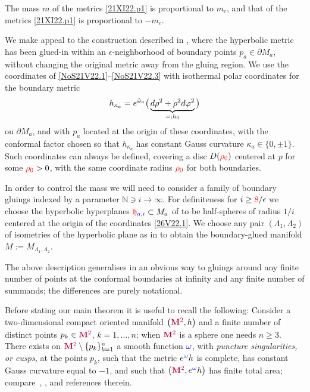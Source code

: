 \documentclass[10pt,a4paper]{article}
\numberwithin{equation}{section}
\newcommand{\blue}[1]{{\color{blue}#1}}
\newcommand{\horo}{\red{\mathfrak{h}}}
\newcommand{\N}{\mathbb N}
\newcommand{\ominf}{\blue{\omega}}
\newcommand{\purple}[1]{{\color{purple}#1}}
\newcommand{\red}[1]{{\color{red}#1}}
\newcommand{\rhozero}{\red{\rho_0}}
\newcommand{\twodimN}{\purple{\mathbf{M}^2}}
\newcommand{\zomega}{\mathring{\omega}}%
\begin{document}
 The mass $m$ of the metrics \eqref{21XI22.p1} is proportional to $m_c$, and that of the metrics \eqref{21XI22.p1} is proportional to $-m_c$.

We make appeal to the construction described in \cite[Section~2]{CDW}, where the hyperbolic metric has been glued-in within an $\epsilon$-neighborhood of boundary points $p_a\in \partial M_a$, {without changing the original metric away from the gluing region}.
We use the coordinates of \eqref{NoS21V22.1}--\eqref{NoS21V22.3}
with isothermal
polar coordinates for the boundary metric
\begin{equation}\label{26V22.1}
 h_{\kappa_a} ={\rm e}^{\zomega_a}
 \big(\underbrace{{\rm d}\rho^2 + \rho^2 {\rm d}\varphi^2}_{=:h_0} \big)
\end{equation}
on $\partial M_a$, and with $p_a$ located at the origin of these coordinates, with the conformal factor chosen so that $h_{\kappa_a}$ has constant Gauss curvature $\kappa_a\in \{0,\pm 1\}$.
Such coordinates can always be defined, covering a disc $D(\rhozero )$ centered at $p$ for some $\rhozero >0$, with the same coordinate radius $\rhozero $ for both boundaries.


In order to control the mass we will need to consider a family of boundary gluings indexed by a parameter $\N\ni i\to\infty$.
For definiteness for $i\ge \red{8}/\epsilon$ we choose the hyperbolic hyperplanes $\blue{\horo_{a,i}}\subset M_a$ of \cite[Section~2]{CDW}
to be half-spheres of radius $1/i$ centered at the origin of the coordinates \eqref{26V22.1}. We choose any pair $(\Lambda_1,\Lambda_2)$ of isometries of the hyperbolic plane as in \cite[Section~2]{CDW} to obtain the boundary-glued manifold $M:=M_{\Lambda_1,\Lambda_2}$.

The above description generalises in an obvious way to gluings around any finite number of points at the conformal boundaries at infinity and any finite number of summands; the differences are purely notational.

Before stating our main theorem it is useful to recall the following:
Consider a two-dimen\-sio\-nal compact oriented manifold $\big(\twodimN ,h \big)$ and a finite number of distinct points {$p_k \in \twodimN $, $k=1,\dots, n$; } when $\twodimN $ is a sphere one needs $n\ge 3$.
There exists on $\twodimN \setminus \{p_k\}_{k=1}^n$ a smooth function $\ominf $, with \emph{puncture singularities, or cusps,} at the points $p_k$, such that the metric ${\rm e}^{\ominf }h $ is complete, has constant Gauss curvature equal to $-1$, and such that $\big(\twodimN ,{\rm e}^{\ominf }{h} \big)$ has finite total area; compare~\cite[Proposition~2.3]{GuillarmouSurfaces}, \cite{ZhangSphere}, and references therein.
\end{document}
